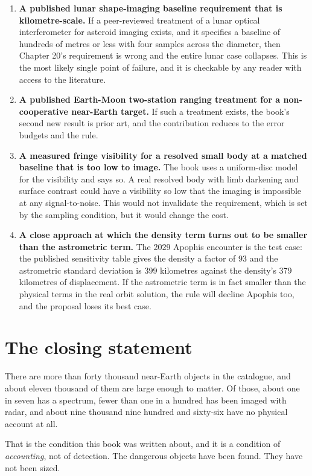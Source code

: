 \begin{enumerate}
\item \textbf{A published lunar shape-imaging baseline requirement that is
kilometre-scale.} If a peer-reviewed treatment of a lunar optical
interferometer for asteroid imaging exists, and it specifies a baseline of
hundreds of metres or less with four samples across the diameter, then
Chapter 20's requirement is wrong and the entire lunar case collapses. This
is the most likely single point of failure, and it is checkable by any
reader with access to the literature.
\item \textbf{A published Earth-Moon two-station ranging treatment for a
non-cooperative near-Earth target.} If such a treatment exists, the book's
second new result is prior art, and the contribution reduces to the error
budgets and the rule.
\item \textbf{A measured fringe visibility for a resolved small body at a
matched baseline that is too low to image.} The book uses a uniform-disc
model for the visibility and says so. A real resolved body with limb
darkening and surface contrast could have a visibility so low that the
imaging is impossible at any signal-to-noise. This would not invalidate the
requirement, which is set by the sampling condition, but it would change
the cost.
\item \textbf{A close approach at which the density term turns out to be
smaller than the astrometric term.} The 2029 Apophis encounter is the test
case: the published sensitivity table gives the density a factor of 93 and
the astrometric standard deviation is 399 kilometres against the density's
379 kilometres of displacement. If the astrometric term is in fact smaller
than the physical terms in the real orbit solution, the rule will decline
Apophis too, and the proposal loses its best case.
\end{enumerate}

\section{The closing statement}

There are more than forty thousand near-Earth objects in the catalogue, and
about eleven thousand of them are large enough to matter. Of those, about
one in seven has a spectrum, fewer than one in a hundred has been imaged
with radar, and about nine thousand nine hundred and sixty-six have no
physical account at all.

That is the condition this book was written about, and it is a condition of
\emph{accounting}, not of detection. The dangerous objects have been found.
They have not been sized.

